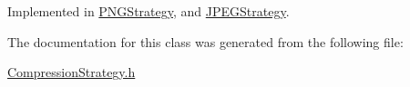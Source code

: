 Implemented in \hyperlink{class_p_n_g_strategy_aaa542a51c70ede4b82facb66d9ff9ec2}{P\+N\+G\+Strategy}, and \hyperlink{class_j_p_e_g_strategy_a3e27b992e48e592c4b127bbeeabc87ce}{J\+P\+E\+G\+Strategy}.



The documentation for this class was generated from the following file\+:\begin{DoxyCompactItemize}
\item 
\hyperlink{_compression_strategy_8h}{Compression\+Strategy.\+h}\end{DoxyCompactItemize}
